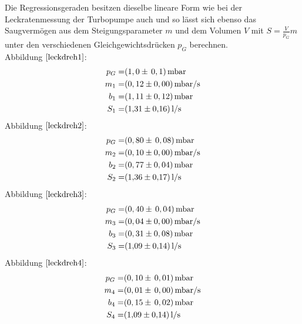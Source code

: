 Die Regressionsgeraden besitzen dieselbe lineare Form wie bei der Leckratenmessung der Turbopumpe auch und so lässt sich ebenso das Saugvermögen
aus dem Steigungsparameter $m$ und dem Volumen $V$ mit $S=\frac{V}{p_G}m$ unter den verschiedenen Gleichgewichtsdrücken $p_G$ berechnen.\\
Abbildung $\ref{leckdreh1}$:
	\begin{align*}
		p_G=& (1,0 \pm \, 0,1)  \, \si{mbar}\\
		m_1=& (0,12 \pm 0,00) \, \si{mbar/s}\\
		b_1=& (1,11 \pm 0,12) \, \si{mbar}\\
		S_1=& \SI{1,31 \pm 0,16}{l/s}
	\end{align*}
	Abbildung $\ref{leckdreh2}$:
		\begin{align*}
			p_G=& (0,80 \pm \, 0,08) \, \si{mbar}\\
			m_2=& (0,10 \pm 0,00) \, \si{mbar/s}\\
			b_2=& (0,77 \pm 0,04) \, \si{mbar}\\
			S_2=& \SI{1,36 \pm 0,17}{l/s}
		\end{align*}
		Abbildung $\ref{leckdreh3}$:
			\begin{align*}
				p_G=& (0,40 \pm \, 0,04) \, \si{mbar}\\
				m_3=& (0,04 \pm 0,00)\, \si{mbar/s}\\
				b_3=& (0,31 \pm 0,08) \, \si{mbar}\\
				S_3=& \SI{1,09 \pm 0,14}{l/s}
			\end{align*}
		Abbildung $\ref{leckdreh4}$:
			\begin{align*}
				p_G=& (0,10 \pm \, 0,01) \, \si{mbar}\\
				m_4=& (0,01 \pm \, 0,00) \, \si{mbar/s}\\
				b_4=& (0,15 \pm \, 0,02) \, \si{mbar}\\
				S_4=& \SI{1,09 \pm 0,14}{l/s}
			\end{align*}
